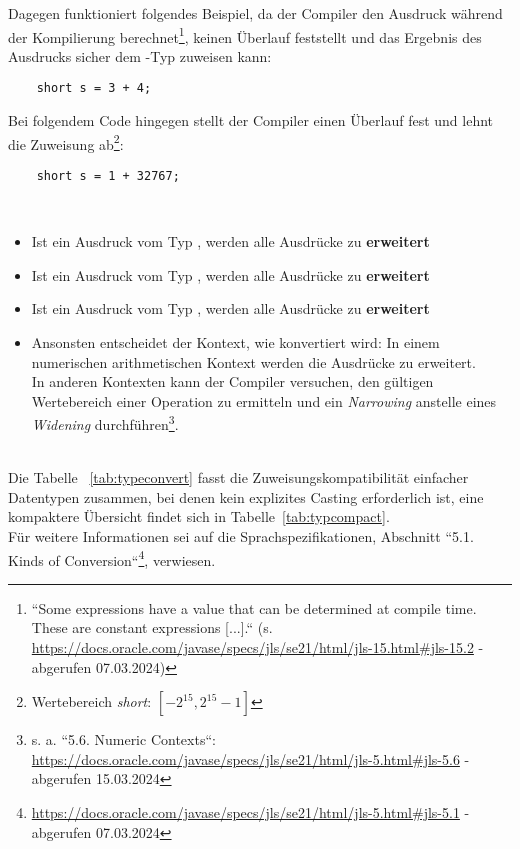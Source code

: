  \noindent
Dagegen funktioniert folgendes Beispiel, da der Compiler den Ausdruck während der Kompilierung berechnet\footnote{
    ``Some expressions have a value that can be determined at compile time. These are constant expressions [...].`` (s. \url{https://docs.oracle.com/javase/specs/jls/se21/html/jls-15.html#jls-15.2} - abgerufen 07.03.2024)
}, keinen Überlauf feststellt und das Ergebnis des Ausdrucks sicher dem -Typ zuweisen kann:

\begin{verbatim}
    short s = 3 + 4;
\end{verbatim}

Bei folgendem Code hingegen stellt der Compiler einen Überlauf fest und lehnt die Zuweisung ab\footnote{Wertebereich \textit{short}: $[-2^{15}, 2^{15} -1]$}:

\begin{verbatim}
    short s = 1 + 32767;
\end{verbatim}\\

\begin{tcolorbox}[title=Typkonvertierung]
\begin{itemize}
    \item Ist ein Ausdruck vom Typ , werden alle Ausdrücke zu  \textbf{erweitert}
    \item Ist ein Ausdruck vom Typ , werden alle Ausdrücke zu  \textbf{erweitert}
    \item Ist ein Ausdruck vom Typ , werden alle Ausdrücke zu  \textbf{erweitert}
    \item Ansonsten entscheidet der Kontext, wie konvertiert wird:  In einem numerischen arithmetischen Kontext werden die Ausdrücke zu  erweitert.\\
    In anderen Kontexten kann der Compiler versuchen, den gültigen Wertebereich einer Operation zu ermitteln und ein \textit{Narrowing} anstelle eines \textit{Widening} durchführen\footnote{
        s. a. ``5.6. Numeric Contexts``: \url{https://docs.oracle.com/javase/specs/jls/se21/html/jls-5.html#jls-5.6} - abgerufen 15.03.2024
    }.
\end{itemize}
\end{tcolorbox}\\

\noindent
Die Tabelle ~\ref{tab:typeconvert} fasst die Zuweisungskompatibilität einfacher Datentypen zusammen, bei denen kein explizites Casting erforderlich ist, eine kompaktere Übersicht findet sich in Tabelle~\ref{tab:typcompact}.\\
Für weitere Informationen sei auf die Sprachspezifikationen, Abschnitt ``5.1. Kinds of Conversion``\footnote{
    \url{https://docs.oracle.com/javase/specs/jls/se21/html/jls-5.html#jls-5.1} - abgerufen 07.03.2024
}, verwiesen.


